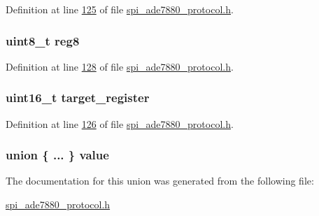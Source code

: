 Definition at line \hyperlink{a00041_source_l00125}{125} of file \hyperlink{a00041_source}{spi\-\_\-ade7880\-\_\-protocol.\-h}.

\hypertarget{a00019_a90b3f782e917edca7101e7803a3773b7}{
\subsubsection[{reg8}]{\setlength{\rightskip}{0pt plus 5cm}uint8\-\_\-t reg8}}\label{dd/da2/a00019_a90b3f782e917edca7101e7803a3773b7}


Definition at line \hyperlink{a00041_source_l00128}{128} of file \hyperlink{a00041_source}{spi\-\_\-ade7880\-\_\-protocol.\-h}.

\hypertarget{a00019_ac02048009fa6718e40f028b6bae63f3d}{
\subsubsection[{target\-\_\-register}]{\setlength{\rightskip}{0pt plus 5cm}uint16\-\_\-t target\-\_\-register}}\label{dd/da2/a00019_ac02048009fa6718e40f028b6bae63f3d}


Definition at line \hyperlink{a00041_source_l00126}{126} of file \hyperlink{a00041_source}{spi\-\_\-ade7880\-\_\-protocol.\-h}.

\hypertarget{a00019_ab4f46e86bbd7d1190771b4881384d603}{
\subsubsection[{value}]{\setlength{\rightskip}{0pt plus 5cm}union \{ ... \}  value}}\label{dd/da2/a00019_ab4f46e86bbd7d1190771b4881384d603}


The documentation for this union was generated from the following file\-:\begin{DoxyCompactItemize}
\item 
\hyperlink{a00041}{spi\-\_\-ade7880\-\_\-protocol.\-h}\end{DoxyCompactItemize}
